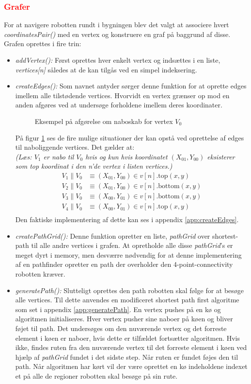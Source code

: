 \subsubsection{ \textcolor{red}{Grafer}}
For at navigere robotten rundt i bygningen blev det valgt at associere hvert \emph{coordinatesPair()} med en vertex og konstruere en graf på baggrund af disse. Grafen oprettes i fire trin:
\begin{itemize}
	\item \emph{addVertex():} Først oprettes hver enkelt vertex og indsættes i en liste, \emph{vertices[n]} således at de kan tilgås ved en simpel indeksering.
	\item \emph{createEdges():} Som navnet antyder sørger denne funktion for at oprette edges imellem alle tilstødende vertices. Hvorvidt en vertex grænser op mod en anden afgøres ved at undersøge forholdene imellem deres koordinater. 
\begin{figure}[h!]
	\label{fig:coordRelation}
	\caption{Eksempel på afgørelse om naboskab for vertex $V_0$}
\end{figure}
På figur \ref{fig:coordRelation} ses de fire mulige situationer der kan opstå ved oprettelse af edges til naboliggende vertices. Det gælder at: \\
\scriptsize\emph{(Læs: $V_1$ er nabo til $V_0$ hvis og kun hvis koordinatet $(X_{01},Y_{00})$ eksisterer som top koordinat i den n'de vertex i listen vertices.)}
\normalsize	 	 
	 \begin{align*}
	 V_1\parallel V_0 & \equiv(X_{01},Y_{00})\in v[n].\text{top}(x,y)	 \\
	 V_2\parallel V_0 & \equiv(X_{01},Y_{00})\in v[n].\text{bottom}(x,y)\\
	 V_3\parallel V_0 & \equiv(X_{00},Y_{01})\in v[n].\text{bottom}(x,y)\\
	 V_4\parallel V_0 & \equiv(X_{00},Y_{01})\in v[n].\text{top}(x,y)\\
	 \end{align*}
Den faktiske implementering af dette kan ses i appendix \ref{app:createEdges}.
	 \item \emph{createPathGrid():} Denne funktion opretter en liste, \emph{pathGrid} over shortest-path til alle andre vertices i grafen. At opretholde alle disse \emph{pathGrid}'s er meget dyrt i memory, men desværre nødvendig for at denne implementering af en pathfinder opretter en path der overholder den 4-point-connectivity robotten kræver.
	 \item \emph{generatePath():} Slutteligt oprettes den path robotten skal følge for at besøge alle vertices. Til dette anvendes en modificeret shortest path first algoritme som set i appendix \ref{app:generatePath}. En vertex pushes på en kø og algoritmen initialiseres. Hver vertex pusher sine naboer på køen og bliver føjet til path. Det undersøges om den nuværende vertex og det forreste element i køen er naboer, hvis dette er tilfældet fortsætter algoritmen. Hvis ikke, findes ruten fra den nuværende vertex til det forreste element i køen ved hjælp af \emph{pathGrid} fundet i det sidste step. Når ruten er fundet føjes den til path. Når algoritmen har kørt vil der være oprettet en kø indeholdene indexet et på alle de regioner robotten skal besøge på sin rute.

\end{itemize}
